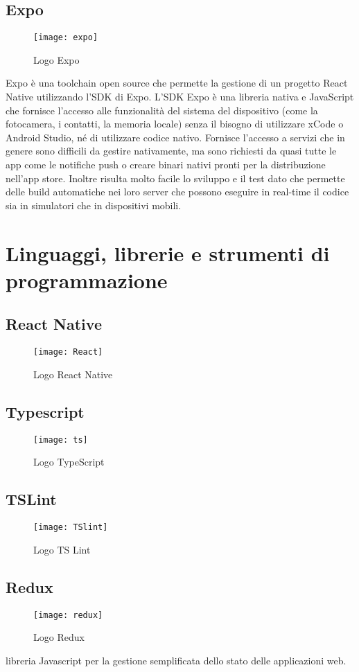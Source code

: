 \subsection{Expo}
\begin{figure}[H] 
	\centering
	\texttt{[image: expo]}
	\caption{Logo Expo}
\end{figure}
	Expo è una toolchain open source che permette la gestione di un progetto React Native utilizzando 
	l'SDK di Expo. L'SDK Expo è una libreria nativa e JavaScript che fornisce l'accesso alle funzionalità del 
	sistema del dispositivo (come la fotocamera, i contatti, la memoria locale) senza il bisogno di 
	utilizzare xCode o Android Studio, né di utilizzare codice nativo. Fornisce l'accesso a servizi che in 
	genere sono difficili da gestire nativamente, ma sono richiesti da quasi tutte le app come le notifiche 
	push o creare binari nativi pronti per la distribuzione nell'app store.
	Inoltre risulta molto facile lo sviluppo e il test dato che permette delle build automatiche nei loro 
	server che possono eseguire in real-time il codice sia in simulatori che in dispositivi mobili.

\section{Linguaggi, librerie e strumenti di programmazione}
\subsection{React Native}
\begin{figure}[H] 
	\centering
	\texttt{[image: React]}
	\caption{Logo React Native}
\end{figure}
\subsection{Typescript}
\begin{figure}[H] 
	\centering
	\texttt{[image: ts]}
	\caption{Logo TypeScript}
\end{figure}
\subsection{TSLint}
\begin{figure}[H] 
	\centering
	\texttt{[image: TSlint]}
	\caption{Logo TS Lint}
\end{figure}
\subsection{Redux}
\begin{figure}[H] 
	\centering
	\texttt{[image: redux]}
	\caption{Logo Redux}
\end{figure}
 libreria Javascript per la gestione semplificata dello stato delle applicazioni web.
 

